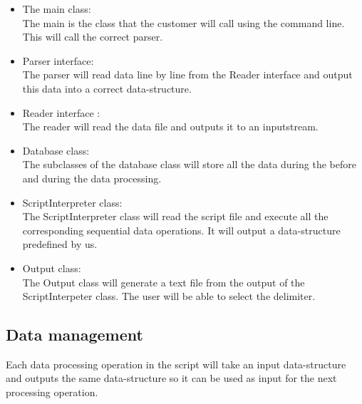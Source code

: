 \documentclass[11pt,twoside,a4paper]{article}
\begin{document}
\begin{itemize}
\item The main class:
\\	The main is the class that the customer will call using the command line. This will call the correct parser.
\item Parser interface: 
\\ The parser will read data line by line from the Reader interface and output this data into a correct data-structure.
\item Reader interface :
\\ The reader will read the data file and outputs it to an inputstream.
\item Database class:
\\ The subclasses of the database class will store all the data during the before and during the data processing.
\item ScriptInterpreter class:
\\ The ScriptInterpreter class will read the script file and execute all the corresponding sequential data operations. It will output a data-structure predefined by us.
\item Output class:
\\ The Output class will generate a text file from the output of the ScriptInterpeter class. The user will be able to select the delimiter.
\end{itemize}

\subsection{Data management} 
Each data processing operation in the script will take an input data-structure and outputs the same data-structure so it can be used as input for the next processing operation.
\end{document}
